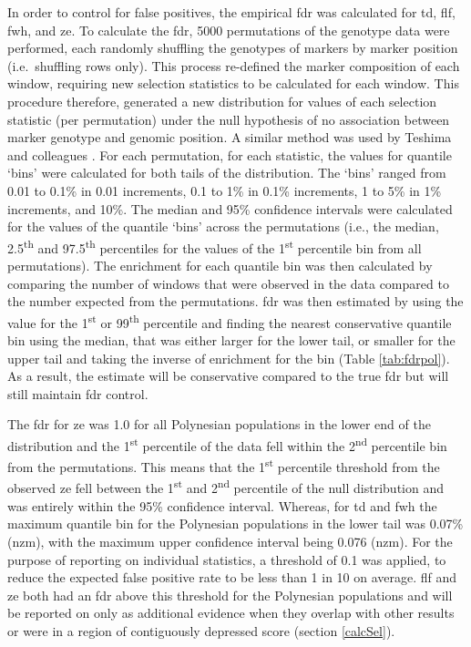 \documentclass[]{report}
\begin{document}
In order to control for false positives, the empirical \gls{fdr} was
calculated for \gls{td}, \gls{flf}, \gls{fwh}, and \gls{ze}. To
calculate the \gls{fdr}, 5000 permutations of the genotype data were
performed, each randomly shuffling the genotypes of markers by marker
position (i.e.~shuffling rows only). This process re-defined the marker
composition of each window, requiring new selection statistics to be
calculated for each window. This procedure therefore, generated a new
distribution for values of each selection statistic (per permutation)
under the null hypothesis of no association between marker genotype and
genomic position. A similar method was used by Teshima and colleagues
\citeyearpar{Teshima2006}. For each permutation, for each statistic, the
values for quantile `bins' were calculated for both tails of the
distribution. The `bins' ranged from 0.01 to 0.1\% in 0.01 increments,
0.1 to 1\% in 0.1\% increments, 1 to 5\% in 1\% increments, and 10\%.
The median and 95\% confidence intervals were calculated for the values
of the quantile `bins' across the permutations (i.e., the median,
2.5\textsuperscript{th} and 97.5\textsuperscript{th} percentiles for the
values of the 1\textsuperscript{st} percentile bin from all
permutations). The enrichment for each quantile bin was then calculated
by comparing the number of windows that were observed in the data
compared to the number expected from the permutations. \Gls{fdr} was
then estimated by using the value for the 1\textsuperscript{st} or
99\textsuperscript{th} percentile and finding the nearest conservative
quantile bin using the median, that was either larger for the lower
tail, or smaller for the upper tail and taking the inverse of enrichment
for the bin (Table \ref{tab:fdrpol}). As a result, the estimate will be
conservative compared to the true \gls{fdr} but will still maintain
\gls{fdr} control.

The \gls{fdr} for \gls{ze} was 1.0 for all Polynesian populations in the
lower end of the distribution and the 1\textsuperscript{st} percentile
of the data fell within the 2\textsuperscript{nd} percentile bin from
the permutations. This means that the 1\textsuperscript{st} percentile
threshold from the observed \gls{ze} fell between the
1\textsuperscript{st} and 2\textsuperscript{nd} percentile of the null
distribution and was entirely within the 95\% confidence interval.
Whereas, for \gls{td} and \gls{fwh} the maximum quantile bin for the
Polynesian populations in the lower tail was 0.07\% (\gls{nzm}), with
the maximum upper confidence interval being 0.076 (\gls{nzm}). For the
purpose of reporting on individual statistics, a threshold of 0.1 was
applied, to reduce the expected false positive rate to be less than 1 in
10 on average. \Gls{flf} and \gls{ze} both had an \gls{fdr} above this
threshold for the Polynesian populations and will be reported on only as
additional evidence when they overlap with other results or were in a
region of contiguously depressed score (section \ref{calcSel}).
\end{document}

